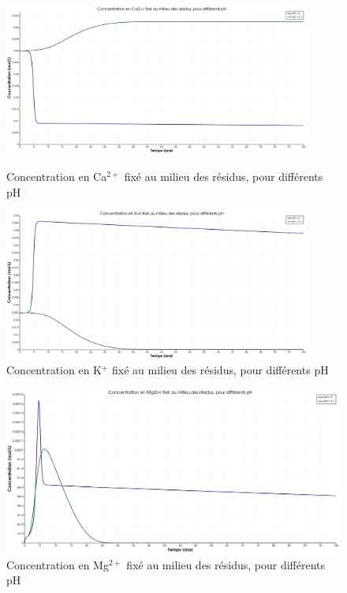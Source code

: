 \documentclass{article}
\begin{document}
\begin{figure}[H]
    \centering
    \begin{minipage}{0.5\textwidth}
        \centering
        \includegraphics[width=0.9\textwidth]{III_B_2_15.png} 
        \caption{Concentration en Ca$^{2+}$ fixé au milieu des résidus, pour différents pH}
        \label{fig:Ca_residus_comparaison}
    \end{minipage}\hfill
    \begin{minipage}{0.5\textwidth}
        \centering
        \includegraphics[width=0.9\textwidth]{III_B_2_16.png} 
        \caption{Concentration en K$^{+}$ fixé au milieu des résidus, pour différents pH}
        \label{fig:K_residus_comparaison}
    \end{minipage}
\end{figure}

\begin{figure}[H]
    \centering
    \includegraphics[width=0.5\linewidth]{III_B_2_17.png}
    \caption{Concentration en Mg$^{2+}$ fixé au milieu des résidus, pour différents pH}
    \label{fig:Mg_residus_comparaison}
\end{figure}
\end{document}
